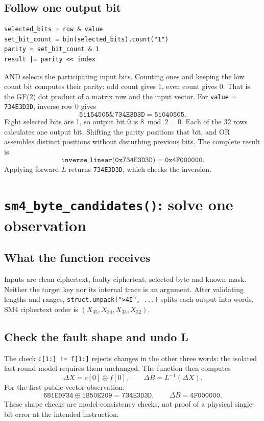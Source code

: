 \documentclass[11pt,a4paper]{article}
\newcommand{\hx}[1]{\texttt{#1}}
\newcommand{\xor}{\mathbin{\oplus}}
\begin{document}
\subsection{Follow one output bit}
\begin{Verbatim}
selected_bits = row & value
set_bit_count = bin(selected_bits).count("1")
parity = set_bit_count & 1
result |= parity << index
\end{Verbatim}
AND selects the participating input bits. Counting ones and keeping the low
count bit computes their parity: odd count gives 1, even count gives 0.
That is the GF(2) dot product of a matrix row and the input vector.
For \hx{value = 734E3D3D}, inverse row 0 gives
\[
\texttt{51154505}\mathbin{\&}\texttt{734E3D3D}=\texttt{51040505}.
\]
Eight selected bits are 1, so output bit 0 is $8\bmod2=0$.
Each of the 32 rows calculates one output bit. Shifting the parity positions
that bit, and OR assembles distinct positions without disturbing previous bits.
The complete result is
\[
\texttt{inverse\_linear(0x734E3D3D)}=\texttt{0x4F000000}.
\]
Applying forward $L$ returns \hx{734E3D3D}, which checks the inversion.



\section{\texorpdfstring{\texttt{sm4\_byte\_candidates()}}{sm4_byte_candidates}: solve one observation}
\subsection{What the function receives}
Inputs are clean ciphertext, faulty ciphertext, selected byte and known mask.
Neither the target key nor its internal trace is an argument. After validating
lengths and ranges, \hx{struct.unpack(">4I", ...)} splits each output into words.
SM4 ciphertext order is $(X_{35},X_{34},X_{33},X_{32})$.

\subsection{Check the fault shape and undo L}
The check \hx{c[1:] != f[1:]} rejects changes in the other three words: the
isolated last-round model requires them unchanged. The function then computes
\[
\Delta X=c[0]\xor f[0],\qquad \Delta B=L^{-1}(\Delta X).
\]
For the first public-vector observation:
\[
\texttt{681EDF34}\xor\texttt{1B50E209}=\texttt{734E3D3D},
\qquad \Delta B=\texttt{4F000000}.
\]
These shape checks are model-consistency checks, not proof of a physical
single-bit error at the intended instruction.
\end{document}
